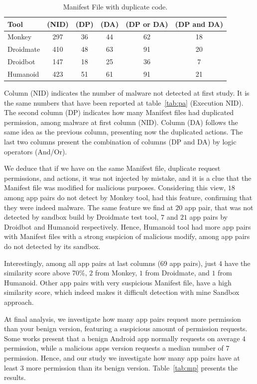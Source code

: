 \begin{table}[ht]
  \caption{Manifest File with duplicate code.}
  \centering
  \begin{small}
 \begin{tabular}{lccccc}
   \toprule
   Tool & (NID) & (DP) & (DA) & (DP or DA) & (DP and DA) \\   \midrule
   Monkey &  297 & 36 & 44 & 62 & 18 \\ 
   Droidmate &  410 & 48 & 63 & 91 & 20 \\ 
   Droidbot &  147 & 18 & 25 & 36 & 7 \\ 
   Humanoid &  423 & 51 & 61 & 91 & 21 \\ 
 \bottomrule
 \end{tabular}
 \end{small}
 \label{tab:mfa}
\end{table}

Column (NID) indicates the number of malware not detected at first study. It is the same numbers that have been reported at table~\ref{tab:pa} (Execution NID). The second column (DP) indicates how many Manifest files had duplicated permission, among malware at first column (NID). Column (DA) follows the same idea as the previous column, presenting now the duplicated actions. The last two columns present the combination of columns (DP and DA) by logic operators (And/Or).

We deduce that if we have on the same Manifest file, duplicate request permissions, and actions, it was not injected by mistake, and it is a clue that the Manifest file was modified for malicious purposes. Considering this view, $18$ among app pairs do not detect by Monkey tool, had this feature, confirming that they were indeed malware. The same feature we find at $20$ app pair, that was not detected by sandbox build by Droidmate test tool, $7$ and $21$ app pairs by Droidbot and Humanoid respectively. Hence, Humanoid tool had more app pairs with Manifest files with a strong suspicion of malicious modify, among app pairs do not detected by its sandbox. 

Interestingly, among all app pairs at last columns (69 app pairs), just $4$ have the similarity score above 70\%, $2$ from Monkey, $1$ from Droidmate, and $1$ from Humanoid. Other app pairs with very suspicious Manifest file, have a high similarity score, which indeed makes it difficult detection with mine Sandbox approach.

At final analysis, we investigate how many app pairs request more permission than your benign version, featuring a suspicious amount of permission requests. Some works present that a benign Android app normally requests on average $4$ permission, while a malicious apps version requests a median number of $7$ permission\cite{DBLP:conf/soups/FeltHEHCW12}\cite{DBLP:journals/tifs/0029LBKTLC17}. Hence, and our study we investigate how many app pairs have at least $3$ more permission than its benign version. Table~\ref{tab:mp} presents the results.

